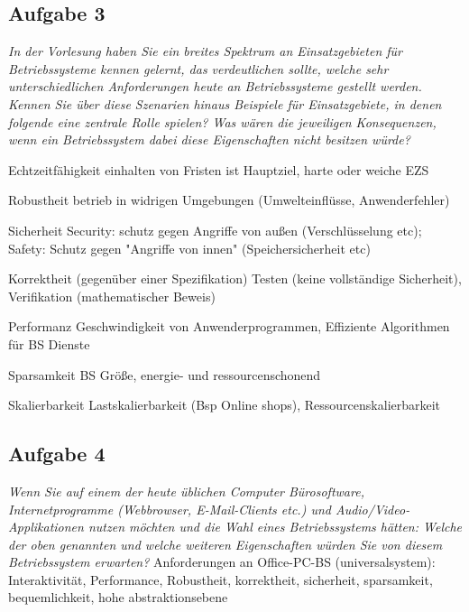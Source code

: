 \documentclass[a4paper]{article}
\begin{document}
\subsection{Aufgabe 3}
\textit{In der Vorlesung haben Sie ein breites Spektrum an Einsatzgebieten für Betriebssysteme kennen gelernt, das verdeutlichen sollte, welche sehr unterschiedlichen Anforderungen heute an Betriebssysteme gestellt werden. Kennen Sie über diese Szenarien hinaus Beispiele für Einsatzgebiete, in denen folgende eine zentrale Rolle spielen? Was wären die jeweiligen Konsequenzen, wenn ein Betriebssystem dabei diese Eigenschaften nicht besitzen würde?}
\vspace{10mm}
\begin{description*}
    \item[Echtzeitfähigkeit] einhalten von Fristen ist Hauptziel, harte oder weiche EZS
    \item[Robustheit] betrieb in widrigen Umgebungen (Umwelteinflüsse, Anwenderfehler)
    \item[Sicherheit] Security: schutz gegen Angriffe von außen (Verschlüsselung etc); Safety: Schutz gegen "Angriffe von innen" (Speichersicherheit etc)
    \item[Korrektheit] (gegenüber einer Spezifikation) Testen (keine vollständige Sicherheit), Verifikation (mathematischer Beweis)
    \item[Performanz] Geschwindigkeit von Anwenderprogrammen, Effiziente Algorithmen für BS Dienste
    \item[Sparsamkeit] BS Größe, energie- und ressourcenschonend
    \item[Skalierbarkeit] Lastskalierbarkeit (Bsp Online shops), Ressourcenskalierbarkeit
\end{description*}


\subsection{Aufgabe 4}
\textit{Wenn Sie auf einem der heute üblichen Computer Bürosoftware, Internetprogramme (Webbrowser, E-Mail-Clients etc.) und Audio/Video-Applikationen nutzen möchten und die Wahl eines Betriebssystems hätten: Welche der oben genannten und welche weiteren Eigenschaften würden Sie von diesem Betriebssystem erwarten?}
\vspace{10mm}
Anforderungen an Office-PC-BS (universalsystem): Interaktivität, Performance, Robustheit, korrektheit, sicherheit, sparsamkeit, bequemlichkeit, hohe abstraktionsebene
\end{document}
